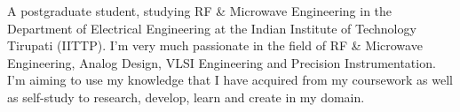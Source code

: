 

\begin{cvparagraph}

A postgraduate student, studying RF \& Microwave Engineering in the Department of Electrical Engineering at the Indian Institute of Technology Tirupati (IITTP). I’m very much passionate in the field of RF \& Microwave Engineering, Analog Design, VLSI Engineering and Precision Instrumentation. I’m aiming to use my knowledge that I have acquired from my coursework as well as self-study to research, develop, learn and create in my domain.
\end{cvparagraph}
